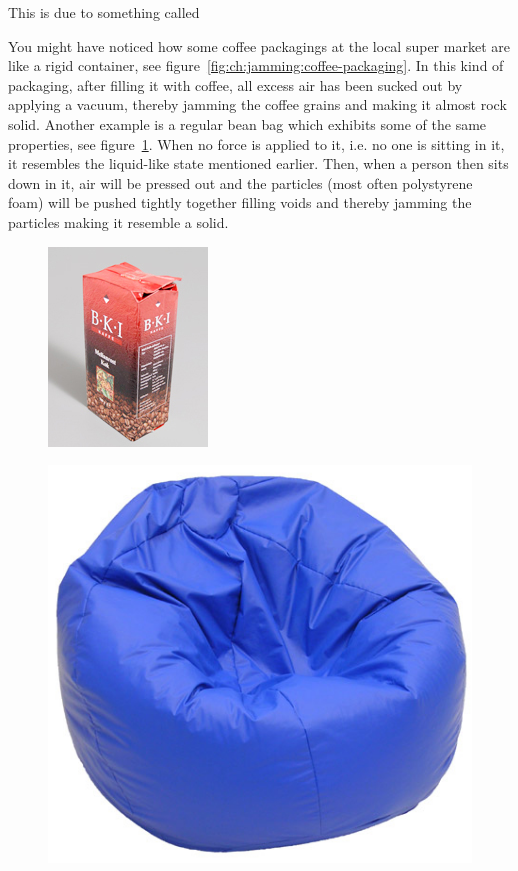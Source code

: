 This is due to something called 

You might have noticed how some coffee packagings at the local super market are like a rigid container, see figure~\ref{fig:ch:jamming:coffee-packaging}. 
In this kind of packaging, after filling it with coffee, all excess air has been sucked out by applying a vacuum, thereby jamming the coffee grains and making it almost rock solid. 
Another example is a regular bean bag which exhibits some of the same properties, see figure~\ref{fig:ch:jamming:bean-bag}. 
When no force is applied to it, i.e. no one is sitting in it, it resembles the liquid-like state mentioned earlier. 
Then, when a person then sits down in it, air will be pressed out and the particles (most often polystyrene foam) will be pushed tightly together filling voids and thereby jamming the particles making it resemble a solid.

\begin{figure}[h]
\centering
\begin{minipage}[t]{.44\textwidth}
  \centering
  \includegraphics[width=.5\linewidth]{figures/jamming/coffee_packaging}
  \label{fig:ch:jamming:coffee-packaging}
\end{minipage}%
\hspace{0.02\textwidth}
\begin{minipage}[t]{.44\textwidth}
  \centering
  \includegraphics[width=.5\linewidth]{figures/jamming/bean_bag}
  \label{fig:ch:jamming:bean-bag}
\end{minipage}
\end{figure}

